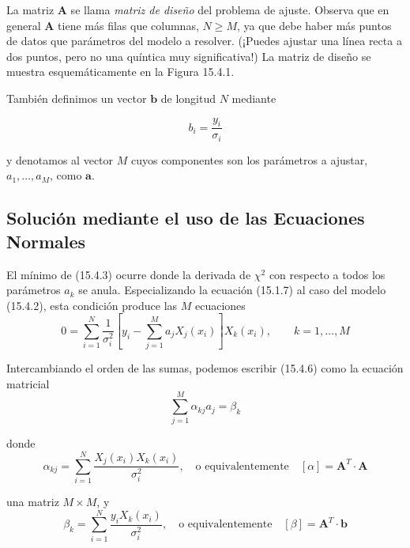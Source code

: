 \documentclass[10pt,a4paper]{book}
\begin{document}
La matriz $\mathbf{A}$ se llama \textit{matriz de diseño} del problema de ajuste. Observa que en general $\mathbf{A}$ tiene más filas que columnas, $N \ge M$, ya que debe haber más puntos de datos que parámetros del modelo a resolver. (¡Puedes ajustar una línea recta a dos puntos, pero no una quíntica muy significativa!) La matriz de diseño se muestra esquemáticamente en la Figura 15.4.1.

También definimos un vector $\mathbf{b}$ de longitud $N$ mediante

\begin{equation}
b_i = \frac{y_i}{\sigma_i}
\tag{15.4.5}
\end{equation}

y denotamos al vector $M$ cuyos componentes son los parámetros a ajustar, $a_1, \ldots, a_M$, como $\mathbf{a}$.

\newpage

\subsection{Solución mediante el uso de las Ecuaciones Normales}

El mínimo de (15.4.3) ocurre donde la derivada de $\chi^2$ con respecto a todos los parámetros $a_k$ se anula. Especializando la ecuación (15.1.7) al caso del modelo (15.4.2), esta condición produce las $M$ ecuaciones
\begin{equation}
0 = \sum_{i=1}^{N} \frac{1}{\sigma_i^2} \left[ y_i - \sum_{j=1}^{M} a_j X_j(x_i) \right] X_k(x_i), \qquad k = 1, \ldots, M
\end{equation}

Intercambiando el orden de las sumas, podemos escribir (15.4.6) como la ecuación matricial
\begin{equation}
\sum_{j=1}^{M} \alpha_{kj} a_j = \beta_k
\end{equation}

donde
\begin{equation}
\alpha_{kj} = \sum_{i=1}^{N} \frac{X_j(x_i) X_k(x_i)}{\sigma_i^2}, \quad \text{o equivalentemente} \quad [\alpha] = \mathbf{A}^T \cdot \mathbf{A}
\end{equation}

una matriz $M \times M$, y
\begin{equation}
\beta_k = \sum_{i=1}^{N} \frac{y_i X_k(x_i)}{\sigma_i^2}, \quad \text{o equivalentemente} \quad [\beta] = \mathbf{A}^T \cdot \mathbf{b}
\end{equation}
\end{document}

